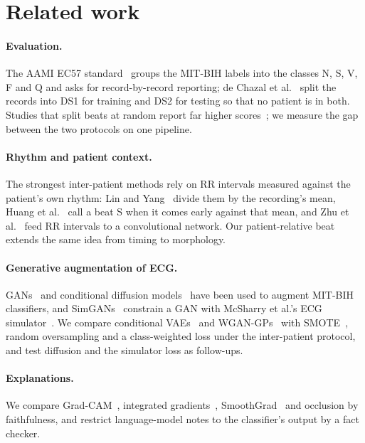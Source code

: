 \documentclass[10pt,a4paper]{article}
\begin{document}
\section{Related work}\label{sec:related}
\paragraph{Evaluation.} The AAMI EC57 standard~\cite{aami2012ec57} groups the MIT-BIH labels into the classes N, S, V, F and Q and
asks for record-by-record reporting; de Chazal et al.~\cite{dechazal2004} split the records into DS1 for training and DS2 for testing
so that no patient is in both. Studies that split beats at random report far higher scores~\cite{kwak2024diffusion}; we measure the
gap between the two protocols on one pipeline.

\paragraph{Rhythm and patient context.} The strongest inter-patient methods rely on RR intervals measured against the patient's own
rhythm: Lin and Yang~\cite{lin2014} divide them by the recording's mean, Huang et al.~\cite{huang2014} call a beat S when it comes early
against that mean, and Zhu et al.~\cite{zhu2022} feed RR intervals to a convolutional network. Our patient-relative beat extends the
same idea from timing to morphology.

\paragraph{Generative augmentation of ECG.} GANs~\cite{shaker2020gan} and conditional diffusion models~\cite{kwak2024diffusion} have
been used to augment MIT-BIH classifiers, and SimGANs~\cite{golany2020simgans} constrain a GAN with McSharry et al.'s ECG
simulator~\cite{mcsharry2003dynamical}. We compare conditional VAEs~\cite{sohn2015cvae} and WGAN-GPs~\cite{gulrajani2017wgangp}
with SMOTE~\cite{chawla2002smote}, random oversampling and a class-weighted loss under the inter-patient protocol, and test diffusion
and the simulator loss as follow-ups.

\paragraph{Explanations.} We compare Grad-CAM~\cite{selvaraju2016gradcam}, integrated gradients~\cite{sundararajan2017ig},
SmoothGrad~\cite{smilkov2017smoothgrad} and occlusion by faithfulness, and restrict language-model notes to the classifier's
output by a fact checker.
\end{document}
